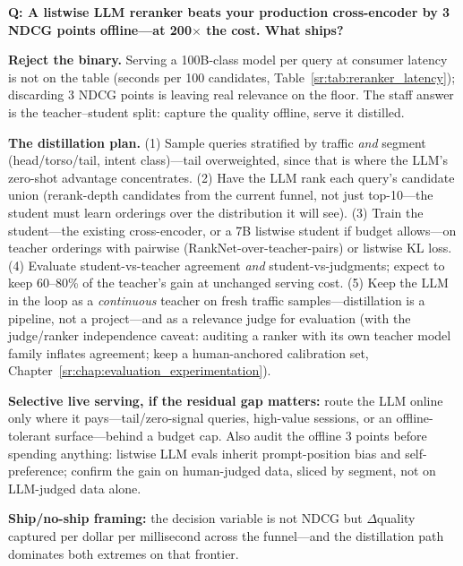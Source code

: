 \begin{interviewq}
\textbf{Q: A listwise LLM reranker beats your production cross-encoder by 3 NDCG points offline---at 200$\times$ the cost. What ships?}

 \quad {} \quad \badgefreq{\freqmed}

\stronganswer

\textbf{Reject the binary.} Serving a 100B-class model per query at consumer latency is not on the table (seconds per 100 candidates, Table~\ref{sr:tab:reranker_latency}); discarding 3 NDCG points is leaving real relevance on the floor. The staff answer is the teacher--student split: capture the quality offline, serve it distilled.

\textbf{The distillation plan.} (1) Sample queries stratified by traffic \textit{and} segment (head/torso/tail, intent class)---tail overweighted, since that is where the LLM's zero-shot advantage concentrates. (2) Have the LLM rank each query's candidate union (rerank-depth candidates from the current funnel, not just top-10---the student must learn orderings over the distribution it will see). (3) Train the student---the existing cross-encoder, or a 7B listwise student if budget allows---on teacher orderings with pairwise (RankNet-over-teacher-pairs) or listwise KL loss. (4) Evaluate student-vs-teacher agreement \textit{and} student-vs-judgments; expect to keep 60--80\% of the teacher's gain at unchanged serving cost. (5) Keep the LLM in the loop as a \textit{continuous} teacher on fresh traffic samples---distillation is a pipeline, not a project---and as a relevance judge for evaluation (with the judge/ranker independence caveat: auditing a ranker with its own teacher model family inflates agreement; keep a human-anchored calibration set, Chapter~\ref{sr:chap:evaluation_experimentation}).

\textbf{Selective live serving, if the residual gap matters:} route the LLM online only where it pays---tail/zero-signal queries, high-value sessions, or an offline-tolerant surface---behind a budget cap. Also audit the offline 3 points before spending anything: listwise LLM evals inherit prompt-position bias and self-preference; confirm the gain on human-judged data, sliced by segment, not on LLM-judged data alone.

\textbf{Ship/no-ship framing:} the decision variable is not NDCG but $\Delta$quality captured per dollar per millisecond across the funnel---and the distillation path dominates both extremes on that frontier.


\end{interviewq}
